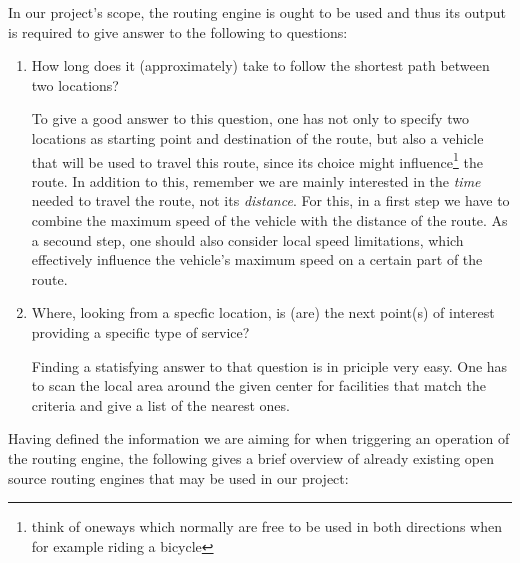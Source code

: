 In our project's scope, the routing engine is ought to be used and thus its output is required to give answer to the following to questions:

\begin{enumerate}

	\item How long does it (approximately) take to follow the shortest path between two locations?
	
		To give a good answer to this question, one has not only to specify two locations as starting point and destination of the route, but also a vehicle that will be used to travel this route, since its choice might influence\footnote{think of oneways which normally are free to be used in both directions when for example riding a bicycle} the route. In addition to this, remember we are mainly interested in the \emph{time} needed to travel the route, not its \emph{distance}. For this, in a first step we have to combine the maximum speed of the vehicle with the distance of the route. As a secound step, one should also consider local speed limitations, which effectively influence the vehicle's maximum speed on a certain part of the route.
	
	\item Where, looking from a specfic location, is (are) the next point(s) of interest providing a specific type of service?
	
		Finding a statisfying answer to that question is in priciple very easy. One has to scan the local area around the given center for facilities that match the criteria and give a list of the nearest ones.

\end{enumerate}

Having defined the information we are aiming for when triggering an operation of the routing engine, the following gives a brief overview of already existing open source routing engines that may be used in our project:

